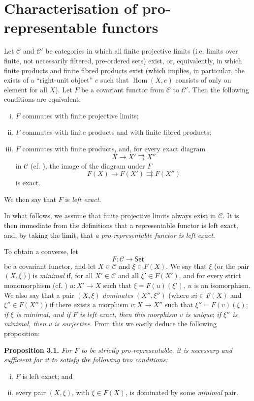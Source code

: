 \documentclass{article}
\newenvironment{itenv}[1]
  {\par\medskip\noindent\textbf{#1.}\itshape}
  {\medskip}
\renewcommand{\cal}[1]{{\mathcal{#1}}}
\newcommand{\Set}{\mathsf{Set}}
\DeclareMathOperator{\Hom}{Hom}
\newcommand{\oldpage}[1]{\marginpar{\footnotesize$\Big\vert$ \textit{p.~#1}}}
\begin{document}
\section{Characterisation of pro-representable functors}
\label{A.3}

Let $\cal{C}$ and $\cal{C}'$ be categories in which all finite projective limits (i.e. limits over finite, not necessarily filtered, pre-ordered sets) exist, or, equivalently, in which finite products and finite fibred products exist (which implies, in particular, the exists of a ``right-unit object'' $e$ such that $\Hom(X,e)$ consists of only on element for all $X$).
Let $F$ be a covariant functor from $\cal{C}$ to $\cal{C}'$.
Then the following conditions are equivalent:
\begin{enumerate}[(i)]
  \item $F$ commutes with finite projective limits;
  \item $F$ commutes with finite products and with finite fibred products;
  \item $F$ commutes with finite products, and, for every exact diagram
    \[
      X\to X'\rightrightarrows X''
    \]
    in $\cal{C}$ (cf. \cite[A, Definition 2.1]{3}), the image of the diagram under $F$
    \[
      F(X)\to F(X')\rightrightarrows F(X'')
    \]
    is exact.
\end{enumerate}
We then say that $F$ is \emph{left exact}.

In what follows, we assume that finite projective limits always exist in $\cal{C}$.
It is then immediate from the definitions that a representable functor is left exact, and, by taking the limit, that \emph{a pro-representable functor is left exact}.

To obtain a converse, let
\[
  F\colon \cal{C} \to \Set
\]
be a covariant functor, and let $X\in\cal{C}$ and $\xi\in F(X)$.
We say that $\xi$ (or the pair
\oldpage{195-06}
$(X,\xi)$) is \emph{minimal} if, for all $X'\in\cal{C}$ and all $\xi'\in F(X')$, and for every strict monomorphism (cf. \cite[A, \S2]{3}) $u\colon X'\to X$ such that $\xi=F(u)(\xi')$, $u$ is an isomorphism.
We also say that a pair $(X,\xi)$ \emph{dominates} $(X'',\xi'')$ (where $xi\in F(X)$ and $\xi''\in F(X'')$) if there exists a morphism $v\colon X\to X''$ such that $\xi''=F(v)(\xi)$;
\emph{if $\xi$ is minimal, and if $F$ is left exact, then this morphism $v$ is unique};
\emph{if $\xi''$ is minimal, then $v$ is surjective}.
From this we easily deduce the following proposition:

\begin{itenv}{Proposition 3.1}
\label{A.3-proposition1}
  For $F$ to be strictly pro-representable, it is necessary and sufficient for it to satisfy the following two conditions:
  \begin{enumerate}[(i)]
    \item $F$ is left exact; and
    \item every pair $(X,\xi)$, with $\xi\in F(X)$, is dominated by some \emph{minimal} pair.
  \end{enumerate}
\end{itenv}
\end{document}
